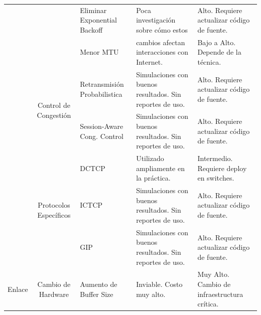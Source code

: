 \documentclass[runningheads,a4paper]{llncs}
\begin{document}
\begin{landscape}
\begin{table}[]
\begin{tabular}{|c|c|l|l|l|}
                                                  &                                                            & Eliminar Exponential Backoff            & Poca investigación sobre cómo estos                                     & Alto. Requiere actualizar código de fuente.                       \\ \cline{3-3} \cline{5-5} 
                                                  &                                                            & Menor MTU                               & cambios afectan interacciones con Internet.                             & Bajo a Alto. Depende de la técnica.                               \\ \cline{2-5} 
                                                  & \multirow{2}{*}{Control de Congestión}                     & Retransmisión Probabilistica            & Simulaciones con buenos resultados. Sin reportes de uso.                & Alto. Requiere actualizar código de fuente.                       \\ \cline{3-5} 
                                                  &                                                            & Session-Aware Cong. Control             & Simulaciones con buenos resultados. Sin reportes de uso.                & Alto. Requiere actualizar código de fuente.                       \\ \cline{2-5} 
                                                  & \multirow{3}{*}{Protocolos Específicos}                    & DCTCP                                   & Utilizado ampliamente en la práctica.                                   & Intermedio. Requiere deploy en switches.                          \\ \cline{3-5} 
                                                  &                                                            & ICTCP                                   & Simulaciones con buenos resultados. Sin reportes de uso.                & Alto. Requiere actualizar código de fuente.                       \\ \cline{3-5} 
                                                  &                                                            & GIP                                     & Simulaciones con buenos resultados. Sin reportes de uso.                & Alto. Requiere actualizar código de fuente.                       \\ \hline
\multirow{4}{*}{Enlace}                           & Cambio de Hardware                                         & Aumento de Buffer Size                  & Inviable. Costo muy alto.                                               & Muy Alto. Cambio de infraestructura crítica.                      \\ \cline{2-5} 

\end{tabular}
\end{table}
\end{landscape}
\end{document}
